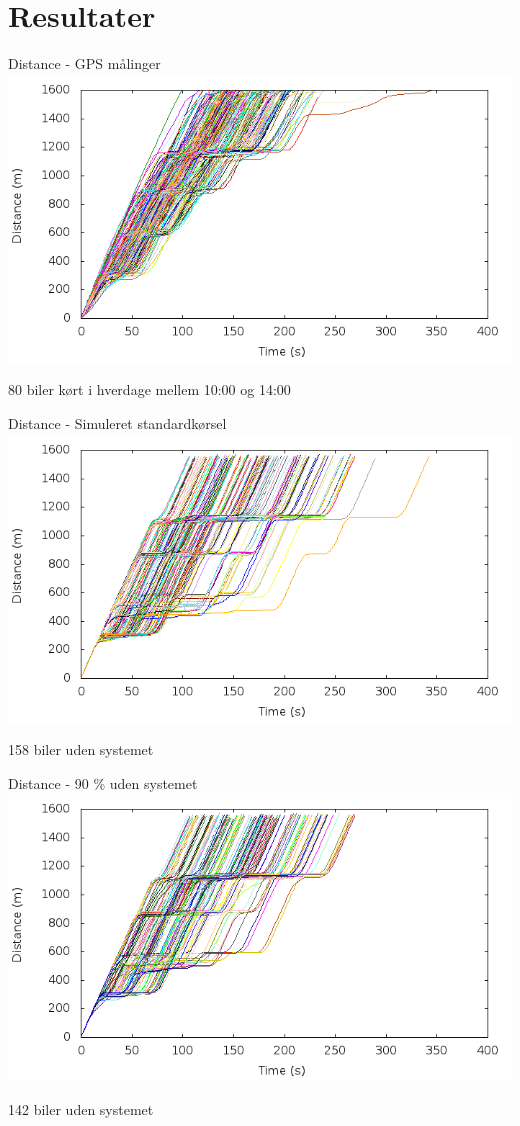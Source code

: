 \section{Resultater}

\begin{frame}{Distance - GPS målinger}
\includegraphics[width=1\textwidth]{../images/Real/RealDistance.png}

80 biler kørt i hverdage mellem 10:00 og 14:00
\end{frame}

\begin{frame}{Distance - Simuleret standardkørsel}
\includegraphics[width=1\textwidth]{../images/tp0c1_0/distanceUncontrolled0.png}

158 biler uden systemet
\end{frame}

\begin{frame}{Distance - 90 \% uden systemet}
\includegraphics[width=1\textwidth]{../images/tp0c1_0/distanceUncontrolled10.png}

142 biler uden systemet
\end{frame}

